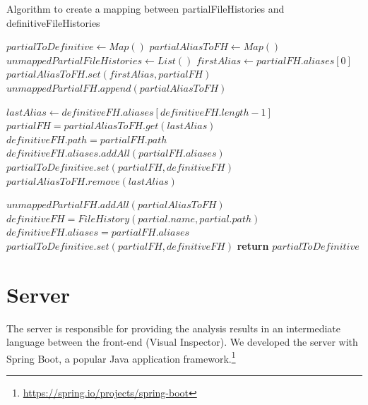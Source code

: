 \begin{algorithm}
    \caption{Algorithm to create a mapping between partialFileHistories and definitiveFileHistories}
    \begin{algorithmic}[1]
        \State $partialToDefinitive \gets Map()$
        \State $partialAliasToFH \gets Map()$ 
        \State $unmappedPartialFileHistories \gets List()$  
            \State $firstAlias \gets partialFH.aliases[0]$
                \State $partialAliasToFH.set(firstAlias, partialFH)$  
            \Else
                \State $unmappedPartialFH.append(partialAliasToFH)$  
            \EndIf
        \EndFor

         
            \State $lastAlias \gets definitiveFH.aliases[definitiveFH.length - 1]$
                \State $partialFH = partialAliasToFH.get(lastAlias)$
                \State $definitiveFH.path = partialFH.path$
                \State $definitiveFH.aliases.addAll(partialFH.aliases)$
                \State $partialToDefinitive.set(partialFH, definitiveFH)$
                \State $partialAliasToFH.remove(lastAlias)$
            \EndIf
        \EndFor

        \State $unmappedPartialFH.addAll(partialAliasToFH)$ 
            \State $definitiveFH = FileHistory(partial.name, partial.path)$
            \State $definitiveFH.aliases = partialFH.aliases $
            \State $partialToDefinitive.set(partialFH, definitiveFH)$
        \EndFor
        \State \textbf{return} $partialToDefinitive$
    \EndProcedure
    \end{algorithmic}
\end{algorithm}


\section{Server}
The server is responsible for providing the analysis results in an intermediate language between the 
front-end (Visual Inspector). We developed the server with Spring Boot, a popular Java application framework.\footnote{\url{https://spring.io/projects/spring-boot}}

